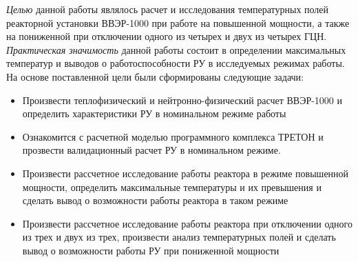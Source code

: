\textit{Целью} данной работы являлось расчет и исследования температурных полей реакторной установки ВВЭР-1000 при работе на повышенной мощности, а также на пониженной при отключении одного из четырех и двух из четырех ГЦН. \textit{Практическая значимость} данной работы состоит в определении максимальных температур и выводов о работоспособности РУ в исследуемых режимах работы. На основе поставленной цели были сформированы следующие задачи:
\begin{itemize}
    \item Произвести теплофизический и нейтронно-физический расчет ВВЭР-1000 и определить характеристики РУ в номинальном режиме работы 
    \item Ознакомится с расчетной моделью программного комплекса ТРЕТОН и прозвести валидационный расчет РУ в номинальном режиме.
    \item Произвести рассчетное исследование работы реактора в режиме повышенной мощности, определить максимальные температуры и их превышения и сделать вывод о возможности работы реактора в таком режиме
    \item Произвести рассчетное исследование работы реактора при отключении одного из трех и двух из трех, произвести анализ температурных полей и сделать вывод о возможности работы РУ при пониженной мощности
\end{itemize}